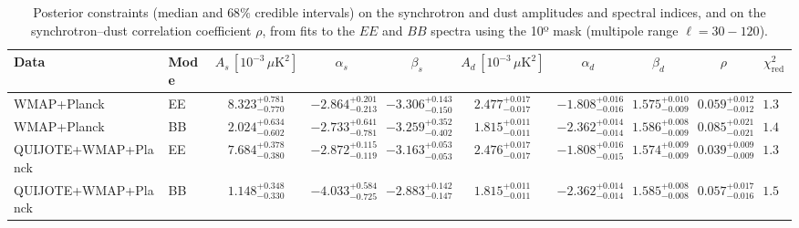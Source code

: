\begin{table}[h]
\centering
\scriptsize
\setlength{\tabcolsep}{4pt}
\caption{Posterior constraints (median and $68\%$ credible intervals) on the synchrotron and dust amplitudes and spectral indices, and on the synchrotron--dust correlation coefficient $\rho$, from fits to the $EE$ and $BB$ spectra using the 10º mask (multipole range $\ell=30-120$).}
\label{tab:fit_no_QQ_autos_ell30-120}
\begin{tabular}{llcccccccc}
\toprule
Data & Mode & $A_s\,[10^{-3}\,\mu\mathrm{K}^2]$ & $\alpha_s$ & $\beta_s$ & $A_d\,[10^{-3}\,\mu\mathrm{K}^2]$ & $\alpha_d$ & $\beta_d$ & $\rho$ & $\chi^2_\mathrm{red}$ \\
\midrule
WMAP+Planck & EE & $8.323^{+0.781}_{-0.770}$ & $-2.864^{+0.201}_{-0.213}$ & $-3.306^{+0.143}_{-0.150}$ & $2.477^{+0.017}_{-0.017}$ & $-1.808^{+0.016}_{-0.016}$ & $1.575^{+0.010}_{-0.009}$ & $0.059^{+0.012}_{-0.012}$ & $1.36$ \\
WMAP+Planck & BB & $2.024^{+0.634}_{-0.602}$ & $-2.733^{+0.641}_{-0.781}$ & $-3.259^{+0.352}_{-0.402}$ & $1.815^{+0.011}_{-0.011}$ & $-2.362^{+0.014}_{-0.014}$ & $1.586^{+0.008}_{-0.009}$ & $0.085^{+0.021}_{-0.021}$ & $1.49$ \\
QUIJOTE+WMAP+Planck & EE & $7.684^{+0.378}_{-0.380}$ & $-2.872^{+0.115}_{-0.119}$ & $-3.163^{+0.053}_{-0.053}$ & $2.476^{+0.017}_{-0.017}$ & $-1.808^{+0.016}_{-0.015}$ & $1.574^{+0.009}_{-0.009}$ & $0.039^{+0.009}_{-0.009}$ & $1.36$ \\
QUIJOTE+WMAP+Planck & BB & $1.148^{+0.348}_{-0.330}$ & $-4.033^{+0.584}_{-0.725}$ & $-2.883^{+0.142}_{-0.147}$ & $1.815^{+0.011}_{-0.011}$ & $-2.362^{+0.014}_{-0.014}$ & $1.585^{+0.008}_{-0.008}$ & $0.057^{+0.017}_{-0.016}$ & $1.50$ \\
\bottomrule
\end{tabular}
\end{table}
